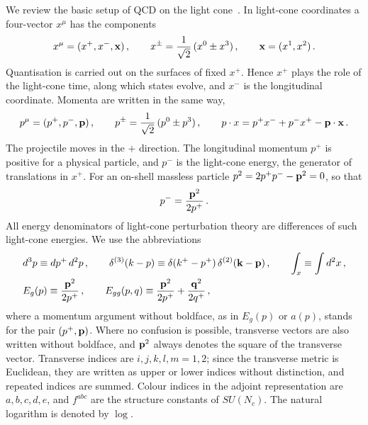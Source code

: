 We review the basic setup of QCD on the light cone~\cite{Lepage:1980fj,Brodsky:1997de}. In light-cone coordinates a four-vector $x^\mu$ has the components
\begin{align}
x^\mu=(x^+,x^-,\mathbf{x})\,,\qquad x^\pm=\frac{1}{\sqrt2}\,(x^0\pm x^3)\,,\qquad \mathbf{x}=(x^1,x^2)\,.
\end{align}
Quantisation is carried out on the surfaces of fixed $x^+$. Hence $x^+$ plays the role of the light-cone time, along which states evolve, and $x^-$ is the longitudinal coordinate. Momenta are written in the same way,
\begin{align}
p^\mu=(p^+,p^-,\mathbf{p})\,,\qquad p^\pm=\frac{1}{\sqrt2}\,(p^0\pm p^3)\,,\qquad p\cdot x=p^+x^-+p^-x^+-\mathbf{p}\cdot\mathbf{x}\,.
\end{align}
The projectile moves in the $+$ direction. The longitudinal momentum $p^+$ is positive for a physical particle, and $p^-$ is the light-cone energy, the generator of translations in $x^+$. For an on-shell massless particle $p^2=2p^+p^--\mathbf{p}^2=0$, so that
\begin{align}\label{eq:energy}
p^-=\frac{\mathbf{p}^2}{2p^+}\,.
\end{align}
All energy denominators of light-cone perturbation theory are differences of such light-cone energies. We use the abbreviations
\begin{align}\label{eq:measure}
&d^3p\equiv dp^+\,d^2p\,,\qquad \delta^{(3)}(k-p)\equiv\delta(k^+-p^+)\,\delta^{(2)}(\mathbf{k}-\mathbf{p})\,,\qquad \int_x\equiv\int d^2x\,,\notag\\
&E_g(p)\equiv\frac{\mathbf{p}^2}{2p^+}\,,\qquad E_{gg}(p,q)\equiv\frac{\mathbf{p}^2}{2p^+}+\frac{\mathbf{q}^2}{2q^+}\,,
\end{align}
where a momentum argument without boldface, as in $E_g(p)$ or $a(p)$, stands for the pair $(p^+,\mathbf{p})$. Where no confusion is possible, transverse vectors are also written without boldface, and $\mathbf{p}^2$ always denotes the square of the transverse vector. Transverse indices are $i,j,k,l,m=1,2$; since the transverse metric is Euclidean, they are written as upper or lower indices without distinction, and repeated indices are summed. Colour indices in the adjoint representation are $a,b,c,d,e$, and $f^{abc}$ are the structure constants of $SU(N_c)$. The natural logarithm is denoted by $\log$.

